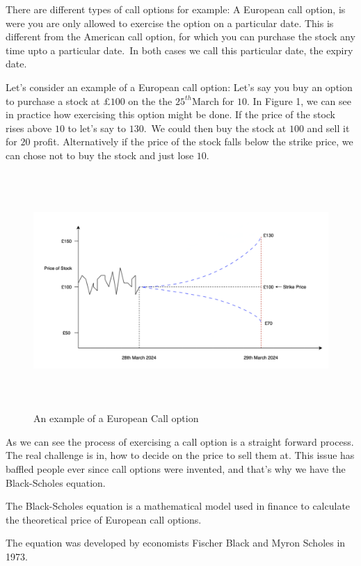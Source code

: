 \documentclass[11pt]{article}
\begin{document}
There are different types of call options for example: A European call option, is were you are only allowed to exercise the option on a particular date. This is different from the American call option, for which you can purchase the stock any time upto a particular date.\ In both cases we call this particular date, the expiry date. 

Let's consider an example of a European call option: Let's say you buy an option to purchase a stock at \textsterling $£100$ on the the $25^{th}$March for \textsterling $10$. In Figure 1, we can see in practice how exercising this option might be done.
If the price of the stock rises above \textsterling$10$ to let's say to \textsterling$130$.\ We could then buy the stock at \textsterling$100$ and sell it for \textsterling$20$ profit. Alternatively if the price of the stock falls below the strike price, we can chose not to buy the stock and just lose \textsterling$10$.
\begin{figure}[H]
\includegraphics[width=1\linewidth, height=9cm]{Call-option.png}
\caption{An example of a European Call option}
\end{figure}
As we can see the process of exercising a call option is a straight forward process. The real challenge is in, how to decide on the price to sell them at. This issue has baffled people ever since call options were invented, and that's why we have the Black-Scholes equation.

The Black-Scholes equation is a mathematical model used in finance to calculate the theoretical price of European call options.

The equation was developed by economists Fischer Black and Myron Scholes in 1973.
\end{document}
